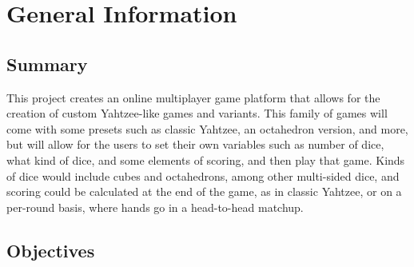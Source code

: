 \documentclass[12pt, titlepage]{article}
\begin{document}

\section{General Information}

\subsection{Summary}

This project creates an online multiplayer game platform that allows for the creation of
custom Yahtzee-like games and variants. This family of games will come with some presets
such as classic Yahtzee, an octahedron version, and more, but will allow for the
users to set their own variables such as number of dice, what kind of dice, and some elements
of scoring, and then play that game. Kinds of dice would include cubes and octahedrons,
among other multi-sided dice, and scoring could be calculated at the end of the game, as in
classic Yahtzee, or on a per-round basis, where hands go in a head-to-head matchup.

\subsection{Objectives}

\iffalse
\wss{State what is intended to be accomplished.  The objective will be around
  the qualities that are most important for your project.  You might have
  something like: ``build confidence in the software correctness,''
  ``demonstrate adequate usability.'' etc.  You won't list all of the qualities,
  just those that are most important.}

\wss{You should also list the objectives that are out of scope.  You don't have 
the resources to do everything, so what will you be leaving out.  For instance, 
if you are not going to verify the quality of usability, state this.  It is also 
worthwhile to justify why the objectives are left out.}

\wss{The objectives are important because they highlight that you are aware of 
limitations in your resources for verification and validation.  You can't do everything, 
so what are you going to prioritize?  As an example, if your system depends on an 
external library, you can explicitly state that you will assume that external library 
has already been verified by its implementation team.}
\fi
\end{document}
